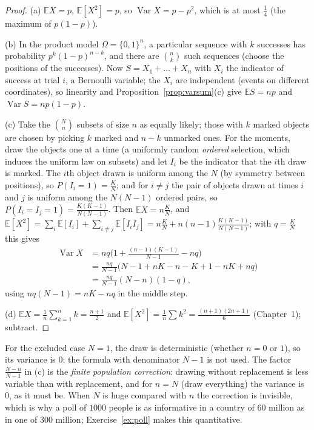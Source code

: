 \begin{proof}
(a) $\mathbb EX=p$, $\mathbb E[X^2]=p$, so $\operatorname{Var}X=p-p^2$, which is at most $\frac14$ (the maximum of $p(1-p)$).

(b) In the product model $\Omega=\{0,1\}^n$, a particular sequence with $k$ successes has probability $p^k(1-p)^{n-k}$, and there are $\binom nk$ such sequences (choose the positions of the successes). Now $S=X_1+\dots+X_n$ with $X_i$ the indicator of success at trial $i$, a Bernoulli variable; the $X_i$ are independent (events on different coordinates), so linearity and Proposition~\ref{prop:varsum}(c) give $\mathbb ES=np$ and $\operatorname{Var}S=np(1-p)$.

(c) Take the $\binom Nn$ subsets of size $n$ as equally likely; those with $k$ marked objects are chosen by picking $k$ marked and $n-k$ unmarked ones. For the moments, draw the objects one at a time (a uniformly random \emph{ordered} selection, which induces the uniform law on subsets) and let $I_i$ be the indicator that the $i$th draw is marked. The $i$th object drawn is uniform among the $N$ (by symmetry between positions), so $P(I_i=1)=\frac KN$; and for $i\ne j$ the pair of objects drawn at times $i$ and $j$ is uniform among the $N(N-1)$ ordered pairs, so $P(I_i=I_j=1)=\frac{K(K-1)}{N(N-1)}$. Then $\mathbb EX=n\frac KN$, and $\mathbb E[X^2]=\sum_i\mathbb E[I_i]+\sum_{i\ne j}\mathbb E[I_iI_j]=n\frac KN+n(n-1)\frac{K(K-1)}{N(N-1)}$; with $q=\frac KN$ this gives
\[
\begin{aligned}\operatorname{Var}X&=nq\Big(1+\frac{(n-1)(K-1)}{N-1}-nq\Big)\\&=\frac{nq}{N-1}\big(N-1+nK-n-K+1-nK+nq\big)\\&=\frac{nq}{N-1}(N-n)(1-q),\end{aligned}
\]
using $nq(N-1)=nK-nq$ in the middle step.

(d) $\mathbb EX=\frac1n\sum_{k=1}^nk=\frac{n+1}2$ and $\mathbb E[X^2]=\frac1n\sum k^2=\frac{(n+1)(2n+1)}6$ (Chapter~1); subtract.
\end{proof}

For the excluded case $N=1$, the draw is deterministic (whether $n=0$ or $1$), so its variance is $0$; the formula with denominator $N-1$ is not used. The factor $\frac{N-n}{N-1}$ in (c) is the \emph{finite population correction}: drawing without replacement is less variable than with replacement, and for $n=N$ (draw everything) the variance is $0$, as it must be. When $N$ is huge compared with $n$ the correction is invisible, which is why a poll of $1000$ people is as informative in a country of $60$ million as in one of $300$ million; Exercise~\ref{ex:poll} makes this quantitative.

